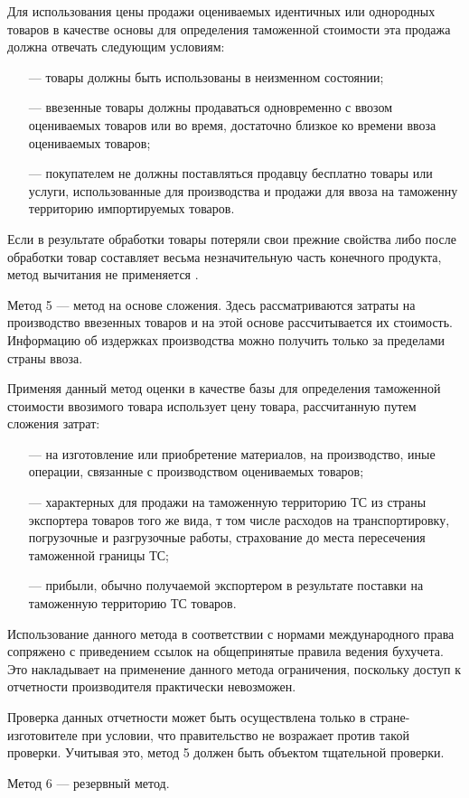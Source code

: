 Для использования цены продажи оцениваемых идентичных или однородных товаров в качестве основы для определения таможенной стоимости эта продажа должна отвечать следующим условиям:
\begin{enumerate}
	\item [---] товары должны быть использованы в неизменном состоянии;
	\item [---] ввезенные товары должны продаваться одновременно с ввозом оцениваемых товаров или во время, достаточно близкое ко времени ввоза оцениваемых товаров;
	\item [---] покупателем не должны поставляться продавцу бесплатно товары или услуги, использованные для производства и продажи для ввоза на таможенну территорию импортируемых товаров.
\end{enumerate}

Если в результате обработки товары потеряли свои прежние свойства либо после обработки товар составляет весьма незначительную часть конечного продукта, метод вычитания не применяется \cites[с. 271--275]{mahovikova}[с. 130--131]{novikova}.

Метод 5 --- метод на основе сложения. Здесь рассматриваются затраты на производство ввезенных товаров и на этой основе рассчитывается их стоимость. Информацию об издержках производства можно получить только за пределами страны ввоза.

Применяя данный метод оценки в качестве базы для определения таможенной стоимости ввозимого товара использует цену товара, рассчитанную путем сложения затрат:
\begin{enumerate}
	\item [---] на изготовление или приобретение материалов, на производство, иные операции, связанные с производством оцениваемых товаров;
	\item [---] характерных для продажи на таможенную территорию ТС из страны экспортера товаров того же вида, т том числе расходов на транспортировку, погрузочные и разгрузочные работы, страхование до места пересечения таможенной границы ТС;
	\item [---] прибыли, обычно получаемой экспортером в результате поставки на таможенную территорию ТС товаров.
\end{enumerate}

Использование данного метода в соответствии с нормами международного права сопряжено с приведением ссылок на общепринятые правила ведения бухучета. Это накладывает на применение данного метода ограничения, поскольку доступ к отчетности производителя практически невозможен.

Проверка данных отчетности может быть осуществлена только в стране-изготовителе при условии, что правительство не возражает против такой проверки. Учитывая это, метод 5 должен быть объектом тщательной проверки.

Метод 6 --- резервный метод.























